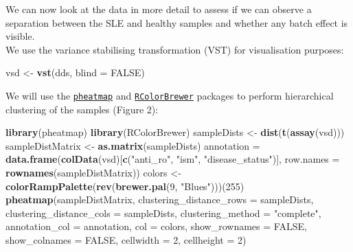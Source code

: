 \documentclass[9pt,a4paper,]{extarticle}
\newenvironment{Shaded}{\begin{snugshade}}{\end{snugshade}}
\newcommand{\KeywordTok}[1]{\textcolor[rgb]{0.13,0.29,0.53}{\textbf{#1}}}
\newcommand{\DataTypeTok}[1]{\textcolor[rgb]{0.13,0.29,0.53}{#1}}
\newcommand{\DecValTok}[1]{\textcolor[rgb]{0.00,0.00,0.81}{#1}}
\newcommand{\StringTok}[1]{\textcolor[rgb]{0.31,0.60,0.02}{#1}}
\newcommand{\OtherTok}[1]{\textcolor[rgb]{0.56,0.35,0.01}{#1}}
\newcommand{\NormalTok}[1]{#1}
\theoremstyle{definition}
\theoremstyle{definition}
\theoremstyle{definition}
\theoremstyle{remark}
\begin{document}
We can now look at the data in more detail to assess if we can observe a separation between the SLE and healthy samples and whether any batch effect is visible.\\
We use the variance stabilising transformation (VST) \citep{Anders2010} for visualisation purposes:

\begin{Shaded}
\begin{Highlighting}[]
\NormalTok{vsd <-}\StringTok{ }\KeywordTok{vst}\NormalTok{(dds, }\DataTypeTok{blind =} \OtherTok{FALSE}\NormalTok{)}
\end{Highlighting}
\end{Shaded}

We will use the \href{http://cran.r-project.org/package=pheatmap}{\texttt{pheatmap}} and \href{https://cran.r-project.org/package=RColorBrewer}{\texttt{RColorBrewer}} packages to perform hierarchical clustering of the samples (Figure 2):

\begin{Shaded}
\begin{Highlighting}[]
\KeywordTok{library}\NormalTok{(pheatmap)}
\KeywordTok{library}\NormalTok{(RColorBrewer)}
\NormalTok{sampleDists <-}\StringTok{ }\KeywordTok{dist}\NormalTok{(}\KeywordTok{t}\NormalTok{(}\KeywordTok{assay}\NormalTok{(vsd)))}
\NormalTok{sampleDistMatrix <-}\StringTok{ }\KeywordTok{as.matrix}\NormalTok{(sampleDists)}
\NormalTok{annotation =}\StringTok{ }\KeywordTok{data.frame}\NormalTok{(}\KeywordTok{colData}\NormalTok{(vsd)[}\KeywordTok{c}\NormalTok{(}\StringTok{"anti_ro"}\NormalTok{, }\StringTok{"ism"}\NormalTok{, }\StringTok{"disease_status"}\NormalTok{)], }\DataTypeTok{row.names =} \KeywordTok{rownames}\NormalTok{(sampleDistMatrix))}
\NormalTok{colors <-}\StringTok{ }\KeywordTok{colorRampPalette}\NormalTok{(}\KeywordTok{rev}\NormalTok{(}\KeywordTok{brewer.pal}\NormalTok{(}\DecValTok{9}\NormalTok{, }\StringTok{"Blues"}\NormalTok{)))(}\DecValTok{255}\NormalTok{)}
\KeywordTok{pheatmap}\NormalTok{(sampleDistMatrix, }\DataTypeTok{clustering_distance_rows =}\NormalTok{ sampleDists, }\DataTypeTok{clustering_distance_cols =}\NormalTok{ sampleDists, }\DataTypeTok{clustering_method =} \StringTok{"complete"}\NormalTok{, }\DataTypeTok{annotation_col =}\NormalTok{ annotation, }\DataTypeTok{col =}\NormalTok{ colors, }\DataTypeTok{show_rownames =} \OtherTok{FALSE}\NormalTok{, }\DataTypeTok{show_colnames =} \OtherTok{FALSE}\NormalTok{, }\DataTypeTok{cellwidth =} \DecValTok{2}\NormalTok{, }\DataTypeTok{cellheight =} \DecValTok{2}\NormalTok{)}
\end{Highlighting}
\end{Shaded}
\end{document}
